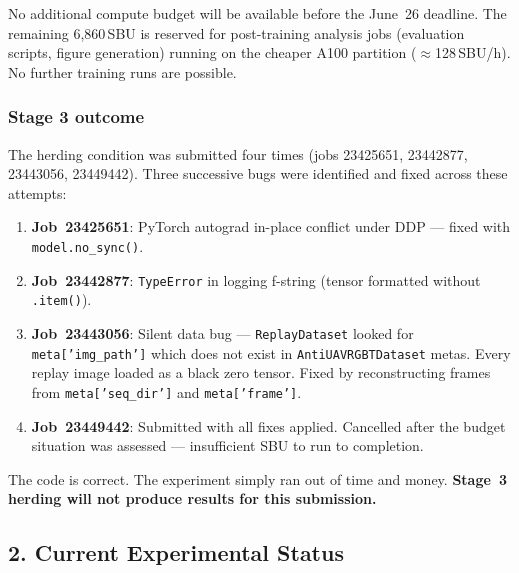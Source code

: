 \noindent No additional compute budget will be available before the
June~26 deadline. The remaining 6,860\,SBU is reserved for
post-training analysis jobs (evaluation scripts, figure generation)
running on the cheaper A100 partition ($\approx$128\,SBU/h). No
further training runs are possible.

\subsubsection*{Stage 3 outcome}

The herding condition was submitted four times (jobs 23425651,
23442877, 23443056, 23449442). Three successive bugs were identified
and fixed across these attempts:

\begin{enumerate}
    \item \textbf{Job~23425651}: PyTorch autograd in-place conflict
    under DDP — fixed with \texttt{model.no\_sync()}.
    \item \textbf{Job~23442877}: \texttt{TypeError} in logging f-string
    (tensor formatted without \texttt{.item()}).
    \item \textbf{Job~23443056}: Silent data bug — \texttt{ReplayDataset}
    looked for \texttt{meta['img\_path']} which does not exist in
    \texttt{AntiUAVRGBTDataset} metas. Every replay image loaded as
    a black zero tensor. Fixed by reconstructing frames from
    \texttt{meta['seq\_dir']} and \texttt{meta['frame']}.
    \item \textbf{Job~23449442}: Submitted with all fixes applied.
    Cancelled after the budget situation was assessed — insufficient
    SBU to run to completion.
\end{enumerate}

\noindent The code is correct. The experiment simply ran out of time
and money. \textbf{Stage~3 herding will not produce results for this
submission.}

\subsection*{2. Current Experimental Status}

